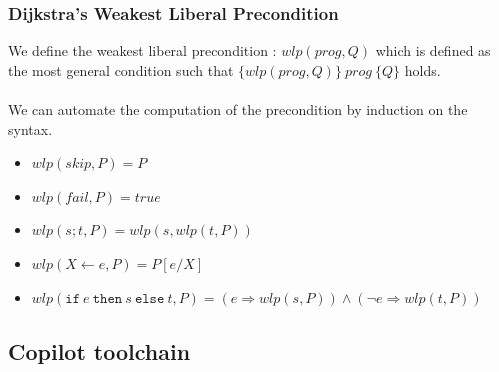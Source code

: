\documentclass{beamer}
\begin{document}
\begin{frame}[fragile]
	\frametitle{Dijkstra's Weakest Liberal Precondition}
	We define the weakest liberal precondition : $wlp(prog,Q)$  which is defined as the most general condition such that $\lbrace wlp(prog,Q) \rbrace~  prog~ \lbrace Q \rbrace$ holds.\\~\\
	We can automate the computation of the precondition by induction on the syntax. 
	\begin{itemize}
		\item $wlp(skip, P) = P$
		\item $wlp(fail, P) = true$
		\item $wlp(s;t, P) = wlp(s, wlp(t, P))$
		\item $wlp(X \leftarrow e, P) = P[e/X]$
		\item $wlp(\texttt{if}~e~\texttt{then}~s~\texttt{else}~t,P) = (e \Rightarrow wlp(s, P)) \wedge (\neg e \Rightarrow wlp(t, P))$ 
	\end{itemize}
	
\end{frame}

  	\subsection{Copilot toolchain}
  	\begin{frame}
  		\tableofcontents[currentsubsection,sectionstyle=show/shaded,subsectionstyle=show/shaded/hide]
  	\end{frame}
\end{document}
